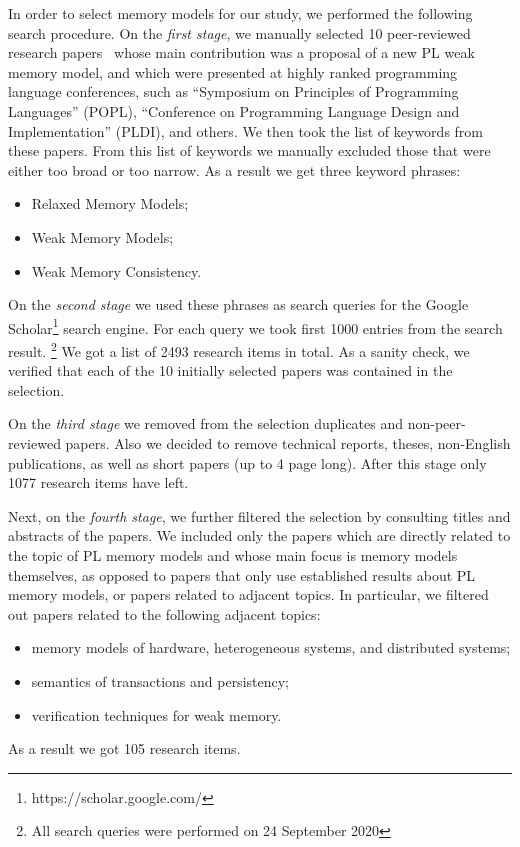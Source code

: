 In order to select memory models for our study, 
we performed the following search procedure.
On the \emph{first stage}, we manually selected 10  
peer-reviewed research papers~\cite{
Manson-al:POPL05,
Batty-al:POPL11,
Lahav-al:PLDI17,
Dolan-al:PLDI18,
Watt-al:PLDI2020,
Jeffrey-Riely:LICS16,
PichonPharabod-Sewell:POPL16,
Kang-al:POPL17,
Chakraborty-Vafeiadis:POPL19,
Paviotti-al:ESOP20
}
whose main contribution was a proposal of a new PL weak memory model, 
and which were presented at highly ranked programming language conferences, 
such as ``Symposium on Principles of Programming Languages'' (POPL),
``Conference on Programming Language Design and Implementation'' (PLDI), and others.
We then took the list of keywords from these papers. 
From this list of keywords we manually excluded those 
that were either too broad or too narrow.
As a result we get three keyword phrases:
\begin{itemize}
  \item Relaxed Memory Models;
  \item Weak Memory Models;
  \item Weak Memory Consistency.
\end{itemize}
 
On the \emph{second stage} we used these phrases as search queries
for the Google Scholar\footnote{https://scholar.google.com/} search engine.
For each query we took first 1000 entries from the search result.%
\footnote{All search queries were performed on 24 September 2020}
We got a list of 2493 research items in total. 
As a sanity check, we verified that each of the 10 initially 
selected papers was contained in the selection. 

On the \emph{third stage} we removed from the selection duplicates
and non-peer-reviewed papers. 
Also we decided to remove technical reports, theses, 
non-English publications, as well as short papers (up to 4 page long).
After this stage only 1077 research items have left.

Next, on the \emph{fourth stage}, we further filtered the selection 
by consulting titles and abstracts of the papers. 
We included only the papers which are directly related to the 
topic of PL memory models and whose main focus is memory models themselves,
as opposed to papers that only use established results about PL memory models,
or papers related to adjacent topics. 
In particular, we filtered out papers related to the following adjacent topics:
\begin{itemize}
  \item memory models of hardware, heterogeneous systems, and distributed systems;
  \item semantics of transactions and persistency;
  \item verification techniques for weak memory.
\end{itemize}
As a result we got 105 research items.

